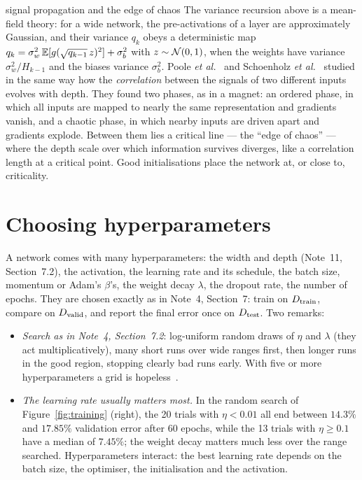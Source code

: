 \documentclass[11pt]{article}
\begin{document}
\begin{physics}{signal propagation and the edge of chaos}
The variance recursion above is a mean-field theory: for a wide network, the pre-activations of a layer are
approximately Gaussian, and their variance $q_k$ obeys a deterministic map $q_k = \sigma_w^2\,\mathbb{E}[g(\sqrt{q_{k-1}}\,z)^2]
+ \sigma_b^2$ with $z \sim \mathcal{N}(0, 1)$, when the weights have variance $\sigma_w^2/H_{k-1}$ and the biases variance
$\sigma_b^2$. Poole \emph{et al.}~\cite{poole2016} and Schoenholz
\emph{et al.}~\cite{schoenholz2017} studied in the same way how the \emph{correlation} between the signals of two
different inputs evolves with depth. They found two phases, as in a magnet: an ordered phase, in which all inputs are
mapped to nearly the same representation and gradients vanish, and a chaotic phase, in which nearby inputs are driven
apart and gradients explode. Between them lies a critical line --- the ``edge of chaos'' --- where the depth scale over
which information survives diverges, like a correlation length at a critical point. Good initialisations place the
network at, or close to, criticality.
\end{physics}

\section{Choosing hyperparameters}\label{sec:hyper}

A network comes with many hyperparameters: the width and depth (Note~11, Section~7.2), the activation, the learning rate and its
schedule, the batch size, momentum or Adam's $\beta$'s, the weight decay $\lambda$, the dropout rate, the number of
epochs. They are chosen exactly as in Note~4, Section~7: train on $D_{\mathrm{train}}$, compare on $D_{\mathrm{valid}}$, and report the final
error once on $D_{\mathrm{test}}$. Two remarks:
\begin{itemize}
\item \emph{Search as in Note~4, Section~7.2}: log-uniform random draws of $\eta$ and $\lambda$ (they act
  multiplicatively), many short runs over wide ranges first, then longer runs in the good region, stopping clearly bad
  runs early. With five or more hyperparameters a grid is hopeless~\cite{bergstra2012}.
\item \emph{The learning rate usually matters most.} In the random search of Figure~\ref{fig:training} (right), the 20
  trials with $\eta < 0.01$ all end between $14.3\%$ and $17.85\%$ validation error after 60 epochs, while the 13 trials with
  $\eta \ge 0.1$ have a median of $7.45\%$; the weight decay matters much less over the range searched. Hyperparameters
  interact: the best learning rate depends on the batch size, the optimiser, the initialisation and the activation.
\end{itemize}
\end{document}
